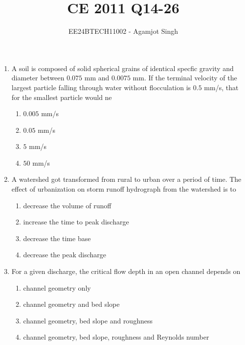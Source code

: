\documentclass[journal,onecolumn]{IEEEtran}
\theoremstyle{remark}
\begin{document}

\vspace{3cm}

\title{CE 2011 Q14-26}
\author{EE24BTECH11002 - Agamjot Singh}
\maketitle

\renewcommand{\thefigure}{\theenumi}
\renewcommand{\thetable}{\theenumi}

\begin{enumerate}

    \item A soil is composed of solid spherical grains of identical specfic gravity and diameter between $0.075$ mm and $0.0075$ mm. If the terminal velocity of the largest particle falling through water without flocculation is $0.5$ mm/s, that for the smallest particle would ne
	\hfill{}

	\begin{enumerate}
		\item $0.005$ mm/s
		\item $0.05$ mm/s
		\item $5$ mm/s
		\item $50$ mm/s
	\end{enumerate}

    \item A watershed got transformed from rural to urban over a period of time. The effect of urbanization on storm runoff hydrograph from the watershed is to
	\hfill{}

	\begin{enumerate}
		\item decrease the volume of runoff
		\item increase the time to peak discharge
		\item decrease the time base
		\item decrease the peak discharge
	\end{enumerate}

    \item For a given discharge, the critical flow depth in an open channel depends on
	\hfill{}

	\begin{enumerate}
		\item channel geometry only
		\item channel geometry and bed slope
		\item channel geometry, bed slope and roughness
		\item channel geometry, bed slope, roughness and Reynolds number
	\end{enumerate}



\end{enumerate}
\end{document}
